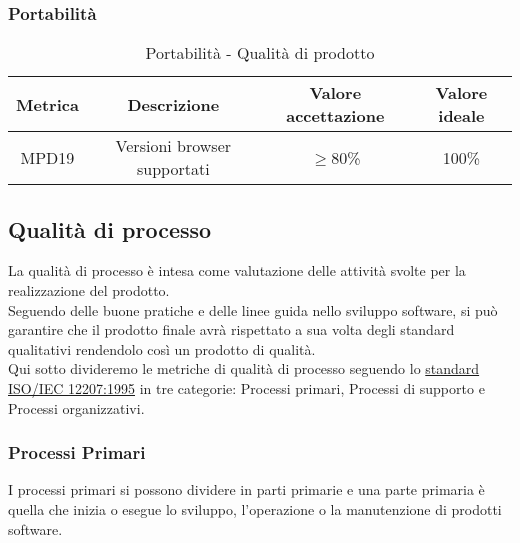\documentclass[11pt]{article}
\begin{document}
\begin{justify}
\subsubsection{Portabilità}
\begin{table}[H]
  \centering
\begin{tabular}{|c|c|c|c|}
  \hline
  \textbf{Metrica} & \textbf{Descrizione} & \textbf{Valore accettazione} & \textbf{Valore ideale}\\
  \hline
  MPD19 & Versioni browser supportati & $\geq$80\% & 100\% \\
  \hline
\end{tabular}
\caption{Portabilità - Qualità di prodotto}
\label{tab:portabilità}
\end{table}


\subsection{Qualità di processo}
La qualità di processo è intesa come valutazione delle attività svolte per la realizzazione del prodotto.\\
Seguendo delle buone pratiche e delle linee guida nello sviluppo software, si può garantire che il prodotto finale avrà rispettato a sua volta degli standard qualitativi rendendolo così un prodotto di qualità.\\
Qui sotto divideremo le metriche di qualità di processo seguendo lo \hyperref[ISO 12207:1995]{standard ISO/IEC 12207:1995} in tre categorie: Processi primari, Processi di supporto e Processi organizzativi.\\
\subsubsection{Processi Primari}
I processi primari si possono dividere in parti primarie e una parte primaria è quella che inizia o esegue lo sviluppo, l'operazione o la manutenzione di prodotti software.\\

\newpage


\end{justify}
\end{document}
